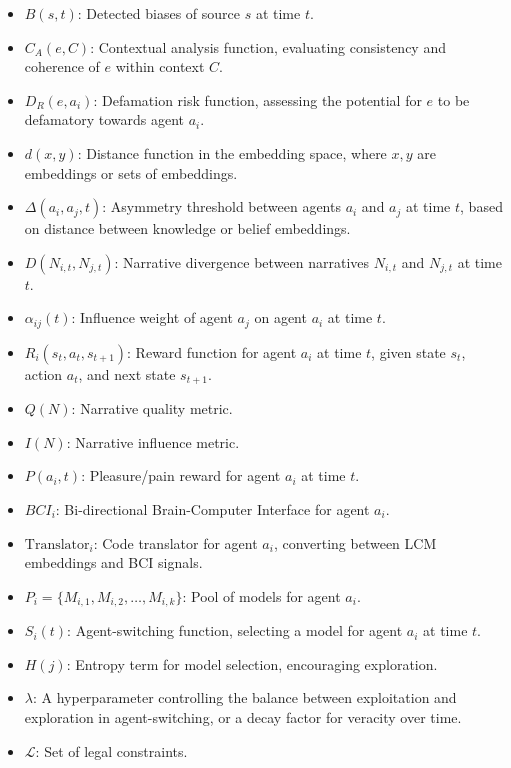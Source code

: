 \documentclass[12pt, a4paper]{article}
\begin{document}
\begin{itemize}
    \item \( B(s,t) \): Detected biases of source \(s\) at time \(t\).
    \item \( C_A(e, C) \): Contextual analysis function, evaluating consistency and coherence of \( e \) within context \( C \).
    \item \( D_R(e, a_i) \): Defamation risk function, assessing the potential for \( e \) to be defamatory towards agent \( a_i \).
    \item \( d(x, y) \): Distance function in the embedding space, where \( x, y \) are embeddings or sets of embeddings.
    \item \( \Delta(a_i, a_j, t) \): Asymmetry threshold between agents \( a_i \) and \( a_j \) at time \( t \), based on distance between knowledge or belief embeddings.
    \item \( D(N_{i,t}, N_{j,t}) \): Narrative divergence between narratives \( N_{i,t} \) and \( N_{j,t} \) at time \(t\).
    \item \( \alpha_{ij}(t) \): Influence weight of agent \( a_j \) on agent \( a_i \) at time \( t \).
    \item \( R_i(s_t, a_t, s_{t+1}) \): Reward function for agent \( a_i \) at time \(t\), given state \(s_t\), action \(a_t\), and next state \(s_{t+1}\).
    \item \( Q(N) \): Narrative quality metric.
    \item \( I(N) \): Narrative influence metric.
    \item \( P(a_i, t) \): Pleasure/pain reward for agent \( a_i \) at time \( t \).
    \item \( BCI_i \): Bi-directional Brain-Computer Interface for agent \( a_i \).
    \item \( \text{Translator}_i \): Code translator for agent \( a_i \), converting between LCM embeddings and BCI signals.
    \item \( P_i = \{M_{i,1}, M_{i,2}, \dots, M_{i,k}\} \): Pool of models for agent \( a_i \).
    \item \( S_i(t) \): Agent-switching function, selecting a model for agent \( a_i \) at time \( t \).
    \item \( H(j) \): Entropy term for model selection, encouraging exploration.
    \item \( \lambda \): A hyperparameter controlling the balance between exploitation and exploration in agent-switching, or a decay factor for veracity over time.
    \item \( \mathcal{L} \): Set of legal constraints.

\end{itemize}
\end{document}
